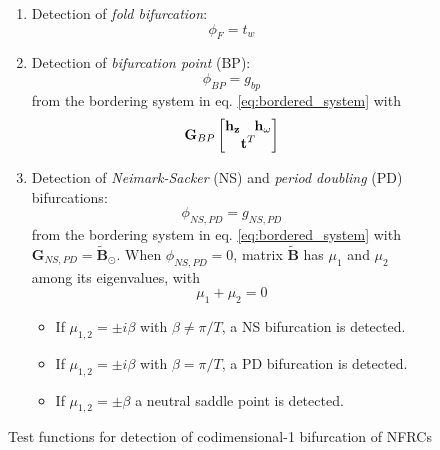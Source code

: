 \begin{figure}[ht!]
  \centering
 \begin{mdframed}
    \begin{enumerate}
    \item Detection of \textit{fold bifurcation}:\\
      \begin{equation*}
        \phi_F = t_{w}
      \end{equation*}
    \item Detection of \textit{bifurcation point} (BP):\\
      \begin{equation*}
        \phi_{BP} = g_{bp}
      \end{equation*}
      from the bordering system in eq. \ref{eq:bordered_system} with
      \begin{equation*}
        \bm G_{BP}
        \begin{bmatrix}
          \bm h_{\bm z} & \bm h_{\omega} \\
          \multicolumn{2}{c}{\bm t^T}
        \end{bmatrix}
      \end{equation*}
    \item Detection of \textit{Neimark-Sacker} (NS) and \textit{period doubling}
      (PD) bifurcations:\\
      \begin{equation*}
        \phi_{NS,PD} = g_{NS,PD}
      \end{equation*}
      from the bordering system in eq. \ref{eq:bordered_system} with $\bm
      G_{NS,PD} = \tilde{\bm B}_\odot$. When $\phi_{NS,PD} = 0$, matrix
      $\tilde{\bm B}$ has $\mu_1$ and $\mu_2$ among its eigenvalues, with
      \begin{equation*}
        \mu_1 + \mu_2 = 0
      \end{equation*}
      \begin{itemize}
      \item If $\mu_{1,2}=\pm i\beta$ with $\beta \neq \pi/T$, a NS
        bifurcation is detected.
      \item If $\mu_{1,2}=\pm i\beta$ with $\beta = \pi/T$, a PD bifurcation is
        detected.
      \item If $\mu_{1,2}=\pm \beta$ a neutral saddle point is detected.
      \end{itemize}
    \end{enumerate}
    \end{mdframed}
    \caption{Test functions for detection of codimensional-1 bifurcation of NFRCs}
    \label{fig:bif_scheme}
\end{figure}

